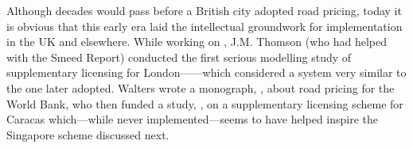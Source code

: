 Although decades would pass before a British city adopted road pricing, today it is obvious that this early era laid the intellectual groundwork for implementation in the UK and elsewhere. While working on \citet{MoT1967}, J.M. Thomson (who had helped with the Smeed Report) conducted the first serious modelling study of supplementary licensing for London---\citet{Thomson1967a}---which considered a system very similar to the one later adopted. Walters wrote a monograph, \citet{Walters1968}, about road pricing for the World Bank, who then funded a study, \citet{Vorhees1973}, on a supplementary licensing scheme for Caracas which---while never implemented---seems to have helped inspire the Singapore scheme discussed next.

